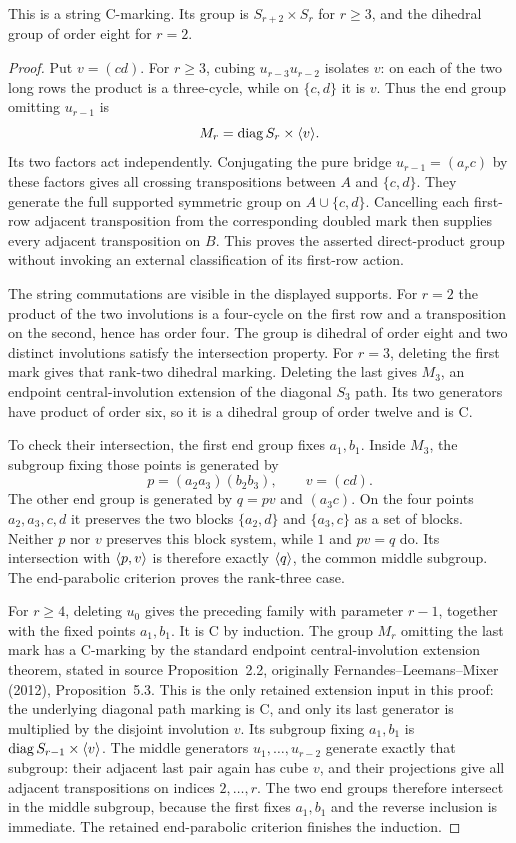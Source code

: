 \documentclass[a4paper,11pt]{article}
\begin{document}
\begin{lemma}\label{lem:auxiliary}
This is a string C-marking. Its group is $S_{r+2}\times S_r$ for $r\geq3$,
and the dihedral group of order eight for $r=2$.
\end{lemma}
\begin{proof}
Put $v=(cd)$. For $r\geq3$, cubing $u_{r-3}u_{r-2}$ isolates $v$:
on each of the two long rows the product is a three-cycle, while on $\{c,d\}$
it is $v$. Thus the end group omitting $u_{r-1}$ is
\[
 M_r=\operatorname{diag}S_r\times\langle v\rangle.
\]
Its two factors act independently. Conjugating the pure bridge
$u_{r-1}=(a_rc)$ by these factors gives all crossing transpositions between
$A$ and $\{c,d\}$. They generate the full supported symmetric group on
$A\cup\{c,d\}$. Cancelling each first-row adjacent transposition from the
corresponding doubled mark then supplies every adjacent transposition on
$B$. This proves the asserted direct-product group without invoking an
external classification of its first-row action.

The string commutations are visible in the displayed supports. For $r=2$
the product of the two involutions is a four-cycle on the first row and a
transposition on the second, hence has order four. The group is dihedral
of order eight and two distinct involutions satisfy the intersection property.
For $r=3$, deleting the first mark gives that rank-two dihedral marking.
Deleting the last gives $M_3$, an endpoint central-involution extension of
the diagonal $S_3$ path. Its two generators have product of order six, so it
is a dihedral group of order twelve and is C.

To check their intersection, the first end group fixes $a_1,b_1$.
Inside $M_3$, the subgroup fixing those points is generated by
\[
 p=(a_2a_3)(b_2b_3),\qquad v=(cd).
\]
The other end group is generated by $q=pv$ and $(a_3c)$.
On the four points $a_2,a_3,c,d$ it preserves the two blocks
$\{a_2,d\}$ and $\{a_3,c\}$ as a set of blocks.
Neither $p$ nor $v$ preserves this block system, while $1$ and $pv=q$ do.
Its intersection with $\langle p,v\rangle$ is therefore exactly $\langle q\rangle$, the common
middle subgroup. The end-parabolic criterion proves the rank-three case.

For $r\geq4$, deleting $u_0$ gives the preceding family with parameter
$r-1$, together with the fixed points $a_1,b_1$. It is C by induction.
The group $M_r$ omitting the last mark has a C-marking by the standard
endpoint central-involution extension theorem, stated in source
Proposition~2.2, originally Fernandes--Leemans--Mixer (2012),
Proposition~5.3. This is the only retained extension input in this proof:
the underlying diagonal path marking is C, and only its last generator is
multiplied by the disjoint involution $v$.
Its subgroup fixing $a_1,b_1$ is
$\operatorname{diag}S_{r-1}\times\langle v\rangle$. The middle generators
$u_1,\ldots,u_{r-2}$ generate exactly that subgroup: their adjacent last pair
again has cube $v$, and their projections give all adjacent transpositions
on indices $2,\ldots,r$. The two end groups therefore intersect in the
middle subgroup, because the first fixes $a_1,b_1$ and the reverse inclusion
is immediate. The retained end-parabolic criterion finishes the induction.
\end{proof}
\end{document}
